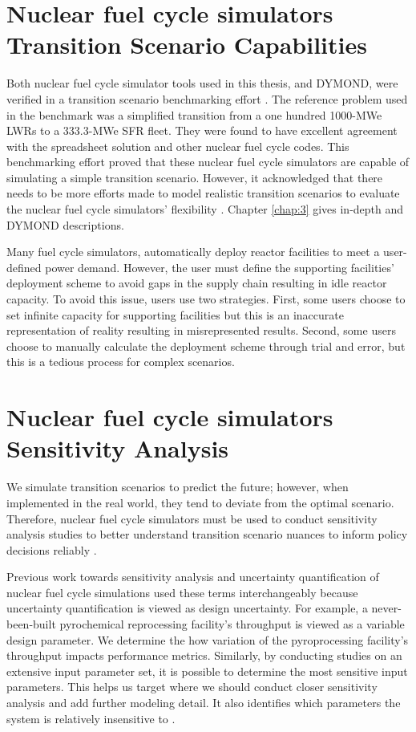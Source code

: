 \section{Nuclear fuel cycle simulators Transition Scenario Capabilities}
Both nuclear fuel cycle simulator tools used in this thesis, \Cyclus and DYMOND,
were verified in a transition scenario benchmarking effort
\cite{feng_standardized_2016,bae_standardized_2019}.
The reference problem used in the benchmark was a simplified 
transition from a one hundred 1000-MWe \glspl{LWR} to a 
333.3-MWe \gls{SFR} fleet. 
They were found to have excellent agreement with the 
spreadsheet solution and other nuclear fuel cycle codes.  
This benchmarking effort proved that these nuclear fuel cycle simulators
are capable of simulating a simple transition scenario. 
However, it acknowledged that there needs to be more efforts 
made to model realistic transition scenarios to evaluate
the nuclear fuel cycle simulators' flexibility \cite{feng_standardized_2016}.
Chapter \ref{chap:3} gives in-depth \Cyclus and DYMOND descriptions.

Many fuel cycle simulators, automatically deploy reactor facilities 
to meet a user-defined power demand. 
However, the user must define the supporting facilities' 
deployment scheme to avoid gaps in the supply 
chain resulting in idle reactor capacity. 
To avoid this issue, users use two strategies. 
First, some users choose to set infinite capacity 
for supporting facilities but this is an inaccurate 
representation of reality resulting in misrepresented results. 
Second, some users choose to manually calculate the deployment 
scheme through trial and error, but this is a tedious process 
for complex scenarios. 

\section{Nuclear fuel cycle simulators Sensitivity Analysis}
We simulate transition scenarios to predict the future; 
however, when implemented in the real world, they tend to deviate 
from the optimal scenario.
Therefore, nuclear fuel cycle simulators must be used to conduct
sensitivity analysis studies to better understand 
transition scenario nuances to inform policy decisions reliably
\cite{passerini_systematic_2014}. 

Previous work towards sensitivity analysis and uncertainty quantification of 
nuclear fuel cycle simulations used these terms interchangeably
because uncertainty quantification is viewed as design uncertainty.
For example, a never-been-built pyrochemical reprocessing 
facility's throughput is viewed as a variable design parameter.
We determine the how variation of the pyroprocessing 
facility's throughput impacts performance metrics.
Similarly, by conducting studies on an extensive input parameter set, 
it is possible to determine the most sensitive input parameters.
This helps us target where we should conduct closer 
sensitivity analysis and add further modeling detail.
It also identifies which parameters the system is relatively 
insensitive to \cite{noauthor_effects_2017}. 

